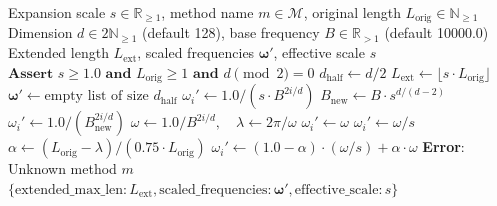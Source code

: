 \documentclass[11pt,a4paper]{article}
\theoremstyle{definition}
\begin{document}
\begin{algorithm}[H]
\caption{Context Window Extension Frequency Scaling}
\label{alg:context_extension}
\begin{algorithmic}[1]
\Require Expansion scale $s \in \mathbb{R}_{\ge 1}$, method name $m \in \mathcal{M}$, original length $L_{\text{orig}} \in \mathbb{N}_{\ge 1}$
\Require Dimension $d \in 2\mathbb{N}_{\ge 1}$ (default 128), base frequency $B \in \mathbb{R}_{> 1}$ (default 10000.0)
\Ensure Extended length $L_{\text{ext}}$, scaled frequencies $\boldsymbol{\omega}'$, effective scale $s$
\State $\textbf{Assert } s \ge 1.0 \textbf{ and } L_{\text{orig}} \ge 1 \textbf{ and } d \pmod 2 = 0$
\State $d_{\text{half}} \gets d / 2$
\State $L_{\text{ext}} \gets \lfloor s \cdot L_{\text{orig}} \rfloor$
\State $\boldsymbol{\omega}' \gets \text{empty list of size } d_{\text{half}}$
        \State $\omega_i' \gets 1.0 / (s \cdot B^{2i / d})$
    \EndFor
{}
    \State $B_{\text{new}} \gets B \cdot s^{d / (d - 2)}$
        \State $\omega_i' \gets 1.0 / (B_{\text{new}}^{2i / d})$
    \EndFor
{}
        \State $\omega \gets 1.0 / B^{2i / d}, \quad \lambda \gets 2\pi / \omega$
            \State $\omega_i' \gets \omega$ 
            \State $\omega_i' \gets \omega / s$ 
        \Else
            \State $\alpha \gets (L_{\text{orig}} - \lambda) / (0.75 \cdot L_{\text{orig}})$
            \State $\omega_i' \gets (1.0 - \alpha) \cdot (\omega / s) + \alpha \cdot \omega$ 
        \EndIf
    \EndFor
\Else
    \State \textbf{Error}: Unknown method $m$
\EndIf
\State \Return $\{\text{extended\_max\_len}: L_{\text{ext}}, \text{scaled\_frequencies}: \boldsymbol{\omega}', \text{effective\_scale}: s\}$
\end{algorithmic}
\end{algorithm}
\end{document}
